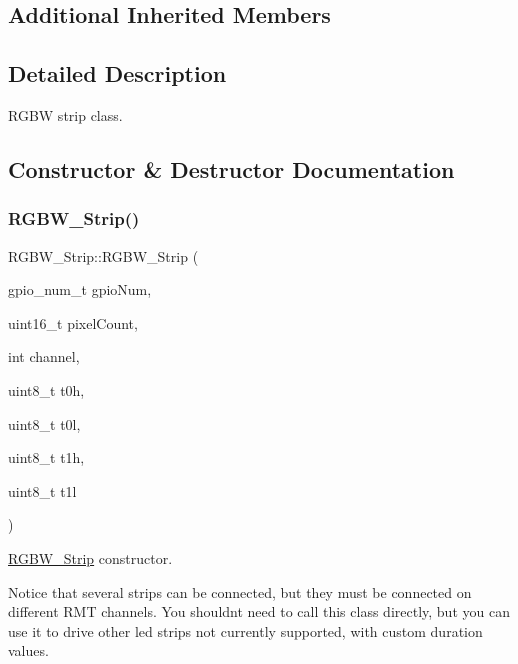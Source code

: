 \subsection*{Additional Inherited Members}


\subsection{Detailed Description}
R\+G\+BW strip class. 

\subsection{Constructor \& Destructor Documentation}
\mbox{\label{classRGBW__Strip_a9d6003c75a32d2f9eec4af86caa1cea1}} 
\subsubsection{\texorpdfstring{RGBW\_Strip()}{RGBW\_Strip()}}
{\footnotesize\ttfamily R\+G\+B\+W\+\_\+\+Strip\+::\+R\+G\+B\+W\+\_\+\+Strip (\begin{DoxyParamCaption}\item[{gpio\+\_\+num\+\_\+t}]{gpio\+Num,  }\item[{uint16\+\_\+t}]{pixel\+Count,  }\item[{int}]{channel,  }\item[{uint8\+\_\+t}]{t0h,  }\item[{uint8\+\_\+t}]{t0l,  }\item[{uint8\+\_\+t}]{t1h,  }\item[{uint8\+\_\+t}]{t1l }\end{DoxyParamCaption})}



\mbox{\hyperlink{classRGBW__Strip}{R\+G\+B\+W\+\_\+\+Strip}} constructor. 

Notice that several strips can be connected, but they must be connected on different R\+MT channels. You shouldn\textquotesingle{}t need to call this class directly, but you can use it to drive other led strips not currently supported, with custom duration values.


